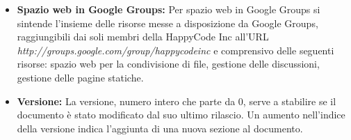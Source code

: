 \documentclass[11pt,titlepage,a4paper]{report}
\begin{document}
\begin{itemize}
\item{\textbf{Spazio web in Google Groups:}
Per spazio web in Google Groups si sintende l'insieme delle risorse messe a disposizione da Google Groups, raggiungibili dai soli membri della HappyCode Inc all'URL\\ \textit{http://groups.google.com/group/happycodeinc} e comprensivo delle seguenti risorse: spazio web per la condivisione di file, gestione delle discussioni, gestione delle pagine statiche.}

\item{\textbf{Versione:}
La versione, numero intero che parte da 0, serve a stabilire se il documento \`e stato modificato dal suo ultimo rilascio. Un aumento nell'indice della versione indica l'aggiunta di  una nuova sezione al documento.}

\end{itemize}

\newpage
\tableofcontents
\end{document}
